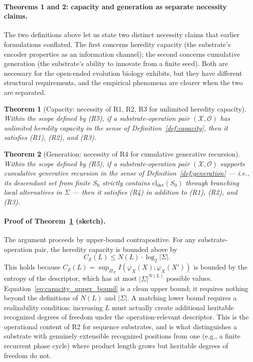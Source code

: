 \documentclass[aps,prx,reprint,amsmath,amssymb,floatfix,superscriptaddress,nofootinbib]{revtex4-2}
\theoremstyle{plain-thm}
\newtheorem{theorem}{Theorem}
\theoremstyle{definition-thm}
\newcommand{\Csub}{C_{\mathcal{S}}}
\newcommand{\descX}{\varphi_X}
\newcommand{\Xset}{\mathcal{X}}
\newcommand{\Op}{\mathcal{O}}
\begin{document}
\paragraph{Theorems 1 and 2: capacity and generation as separate necessity claims.}

The two definitions above let us state two distinct necessity claims that earlier formulations conflated. The first concerns heredity capacity (the substrate's encoder properties as an information channel); the second concerns cumulative generation (the substrate's ability to innovate from a finite seed). Both are necessary for the open-ended evolution biology exhibits, but they have different structural requirements, and the empirical phenomena are clearer when the two are separated.

\begin{theorem}[Capacity: necessity of R1, R2, R3 for unlimited heredity capacity]
\label{thm:capacity}
Within the scope defined by \textnormal{(R5)}, if a substrate-operation pair $(\Xset, \Op)$ has unlimited heredity capacity in the sense of Definition~\ref{def:capacity}, then it satisfies \textnormal{(R1)}, \textnormal{(R2)}, and \textnormal{(R3)}.
\end{theorem}

\begin{theorem}[Generation: necessity of R4 for cumulative generative recursion]
\label{thm:generation}
Within the scope defined by \textnormal{(R5)}, if a substrate-operation pair $(\Xset, \Op)$ supports cumulative generative recursion in the sense of Definition~\ref{def:generation} --- i.e., its descendant set from finite $S_0$ strictly contains $\mathrm{cl}_{\det}(S_0)$ through branching local alternatives in $\Sigma$ --- then it satisfies \textnormal{(R4)} in addition to \textnormal{(R1)}, \textnormal{(R2)}, and \textnormal{(R3)}.
\end{theorem}

\paragraph{Proof of Theorem~\ref{thm:capacity} (sketch).} The argument proceeds by upper-bound contrapositive. For any substrate-operation pair, the heredity capacity is bounded above by
\begin{equation}
\Csub(L) \le N(L) \cdot \log_2 |\Sigma|.
\label{eq:capacity_upper_bound}
\end{equation}
This holds because $\Csub(L) = \sup_{\Pi_X} I(\descX(X); \descX(X'))$ is bounded by the entropy of the descriptor, which has at most $|\Sigma|^{N(L)}$ possible values. Equation~\ref{eq:capacity_upper_bound} is a clean upper bound; it requires nothing beyond the definitions of $N(L)$ and $|\Sigma|$. A matching lower bound requires a realizability condition: increasing $L$ must actually create additional heritable recognized degrees of freedom under the operation-relevant descriptor. This is the operational content of R2 for sequence substrates, and is what distinguishes a substrate with genuinely extensible recognized positions from one (e.g., a finite recurrent phase cycle) where product length grows but heritable degrees of freedom do not.
\end{document}
